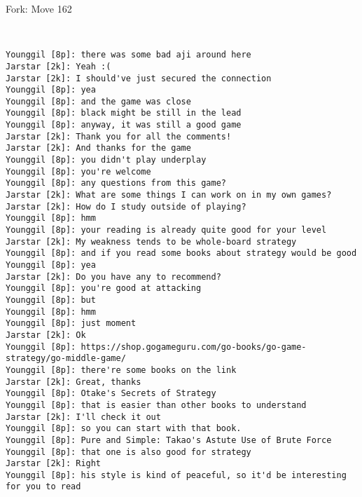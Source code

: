 \documentclass{article}
\begin{document}
\begin{subsection}{Fork: Move 162}
\begin{center}
\cleargoban
{}
\showfullgoban
\\\begin{lstlisting}
Younggil [8p]: there was some bad aji around here
Jarstar [2k]: Yeah :(
Jarstar [2k]: I should've just secured the connection
Younggil [8p]: yea
Younggil [8p]: and the game was close
Younggil [8p]: black might be still in the lead
Younggil [8p]: anyway, it was still a good game
Jarstar [2k]: Thank you for all the comments!
Jarstar [2k]: And thanks for the game
Younggil [8p]: you didn't play underplay
Younggil [8p]: you're welcome
Younggil [8p]: any questions from this game?
Jarstar [2k]: What are some things I can work on in my own games?
Jarstar [2k]: How do I study outside of playing?
Younggil [8p]: hmm
Younggil [8p]: your reading is already quite good for your level
Jarstar [2k]: My weakness tends to be whole-board strategy
Younggil [8p]: and if you read some books about strategy would be good
Younggil [8p]: yea
Jarstar [2k]: Do you have any to recommend?
Younggil [8p]: you're good at attacking
Younggil [8p]: but 
Younggil [8p]: hmm
Younggil [8p]: just moment
Jarstar [2k]: Ok
Younggil [8p]: https://shop.gogameguru.com/go-books/go-game-strategy/go-middle-game/
Younggil [8p]: there're some books on the link
Jarstar [2k]: Great, thanks
Younggil [8p]: Otake's Secrets of Strategy 
Younggil [8p]: that is easier than other books to understand
Jarstar [2k]: I'll check it out
Younggil [8p]: so you can start with that book.
Younggil [8p]: Pure and Simple: Takao's Astute Use of Brute Force
Younggil [8p]: that one is also good for strategy
Jarstar [2k]: Right
Younggil [8p]: his style is kind of peaceful, so it'd be interesting for you to read
\end{lstlisting}
\end{center}
\end{subsection}
\newpage
\end{document}
